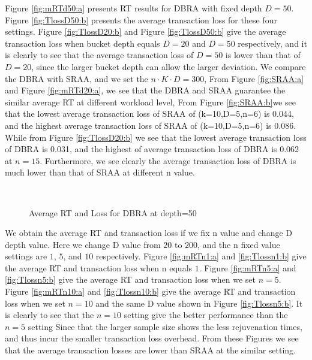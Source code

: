 \documentclass[10pt,journal,letterpaper,compsoc]{IEEEtran}
\begin{document}
Figure \ref{fig:mRTd50:a} presents RT results for DBRA with fixed depth $D=50$.
Figure \ref{fig:TlossD50:b} presents the average transaction loss for these four settings.
Figure \ref{fig:TlossD20:b} and Figure \ref{fig:TlossD50:b} give the average transaction
loss when bucket depth equals $D=20$ and $D=50$ respectively,
and it is clearly to see that the average transaction loss of $D=50$ is lower than
that of $D=20$, since the larger bucket depth can allow the larger deviation.
We compare the DBRA with SRAA, and we set the $n\cdot K\cdot D=300$,
From Figure \ref{fig:SRAA:a} and Figure \ref{fig:mRTd20:a},
we see that the DBRA and SRAA guarantee the similar average RT at different workload level,
From Figure \ref{fig:SRAA:b}we see that the lowest average transaction loss of SRAA of (k=10,D=5,n=6)
is 0.044, and the highest average transaction loss of SRAA of (k=10,D=5,n=6) is 0.086.
While from Figure \ref{fig:TlossD20:b} we see that the lowest average transaction loss of DBRA
is 0.031, and the highest of average transaction loss of DBRA is 0.062 at $n=15$.
Furthermore, we see clearly the average transaction loss of DBRA is much lower than that of SRAA
at different n value.

\begin{figure}[htb]
\centering
{}
\\
\caption{Average RT and Loss for DBRA at depth=50}
\end{figure}

We obtain the average RT and transaction loss if we fix n value and change D depth value.
Here we change D value from $20$ to $200$, and the n fixed value settings are $1$, $5$, and $10$
respectively.
Figure \ref{fig:mRTn1:a} and \ref{fig:Tlossn1:b} give the average RT and transaction loss
when n equals $1$.
Figure \ref{fig:mRTn5:a} and \ref{fig:Tlossn5:b} give the average RT and transaction loss
when we set $n=5$.
Figure \ref{fig:mRTn10:a} and \ref{fig:Tlossn10:b} give the average RT and transaction loss
when we set $n=10$ and the same D value shown in Figure \ref{fig:Tlossn5:b}.
It is clearly to see that the $n=10$ setting give the better performance than the $n=5$ setting
Since that the larger sample size shows the less rejuvenation times, and thus incur the smaller
transaction loss overhead.
From these Figures we see that the average transaction losses are lower than SRAA at the similar setting.
\end{document}
